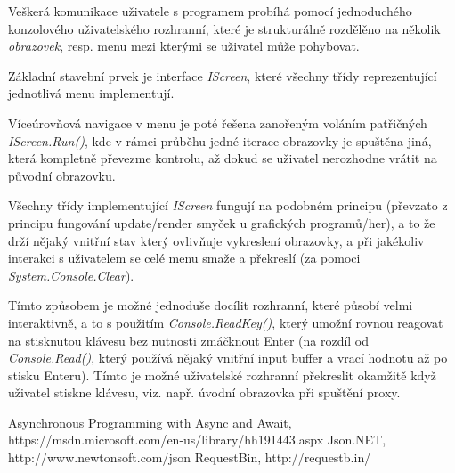 \documentclass{article}
\begin{document}
Veškerá komunikace uživatele s programem probíhá pomocí jednoduchého konzolového uživatelského rozhranní, které je strukturálně rozdělěno na několik \emph{obrazovek}, resp. menu mezi kterými se uživatel může pohybovat.

Základní stavební prvek je interface \emph{IScreen}, které všechny třídy reprezentující jednotlivá menu implementují.

Víceúrovňová navigace v menu je poté řešena zanořeným voláním patřičných \emph{IScreen.Run()}, kde v rámci průběhu jedné iterace obrazovky je spuštěna jiná, která kompletně převezme kontrolu, až dokud se uživatel nerozhodne vrátit na původní obrazovku.

Všechny třídy implementující \emph{IScreen} fungují na podobném principu (převzato z principu fungování update/render smyček u grafických programů/her), a to že drží nějaký vnitřní stav který ovlivňuje vykreslení obrazovky, a při jakékoliv interakci s uživatelem se celé menu smaže a překreslí (za pomoci \emph{System.Console.Clear}).

Tímto způsobem je možné jednoduše docílit rozhranní, které působí velmi interaktivně, a to s použitím \emph{Console.ReadKey()}, který umožní rovnou reagovat na stisknutou klávesu bez nutnosti zmáčknout Enter (na rozdíl od \emph{Console.Read()}, který používá nějaký vnitřní input buffer a vrací hodnotu až po stisku Enteru). Tímto je možné uživatelské rozhranní překreslit okamžitě když uživatel stiskne klávesu, viz. např. úvodní obrazovka při spuštění proxy.


\begin{thebibliography}{100}
	 Asynchronous Programming with Async and Await, https://msdn.microsoft.com/en-us/library/hh191443.aspx
	 Json.NET, http://www.newtonsoft.com/json
	 RequestBin, http://requestb.in/
\end{thebibliography}
\end{document}
